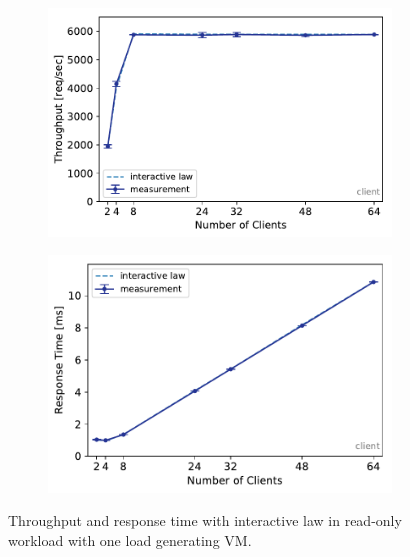 \documentclass[11pt,a4paper]{article}
\begin{document}
\begin{figure}
	\begin{subfigure}[b]{.49\linewidth}
		\centering
		\includegraphics[width=\linewidth]{data/exp22_ro_tp_nc.pdf}
	\end{subfigure}\hfill
	\begin{subfigure}[b]{.49\linewidth}
		\centering
		\includegraphics[width=\linewidth]{data/exp22_ro_rt_nc.pdf}
	\end{subfigure}%
	\caption{Throughput and response time with interactive law in read-only workload with one load generating VM.}
	\label{exp22_ro_nc}
\end{figure}
\end{document}
